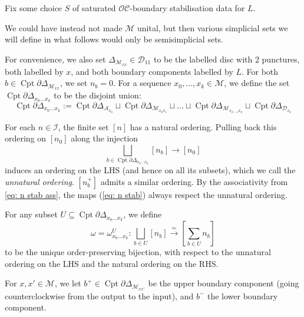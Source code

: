 \documentclass{TPmod}
\newcommand{\Cptd}{\operatorname{Cpt}\partial}
\newcommand{\cA}{\mathcal{A}}
\newcommand{\cC}{\mathcal{C}}
\newcommand{\cD}{\mathcal{D}}
\newcommand{\cI}{\mathcal{I}}
\newcommand{\cM}{\mathcal{M}}
\newcommand{\cO}{\mathcal{O}}
\renewcommand{\cong}{\simeq}
\numberwithin{equation}{section}
\begin{document}
    Fix some choice $S$ of saturated $\cO\cC$-boundary stabilisation data for $L$.

    
    
    

    \begin{rmk}
        We could have instead not made $\cM$ unital, but then various simplicial sets we will define in what follows would only be semisimplicial sets.
    \end{rmk}

    
    For convenience, we also set $\Delta_{\cM_{xx}} \in \cD_{11}$ to be the labelled disc with 2 punctures, both labelled by $x$, and both boundary components labelled by $L$. For both $b \in \Cptd\Delta_{\cM_{xx}}$, we set $n_b = 0$. For a sequence $x_0, \ldots, x_k \in \cM$, we define the set $\Cptd\Delta_{x_0 \ldots x_k}$ to be the disjoint union:
    \begin{equation}
        \Cptd\Delta_{x_0 \ldots x_k} := \Cptd\Delta_{\cA_{x_0}} \sqcup \Cptd\Delta_{\cM_{x_0 x_1}} \sqcup \ldots \sqcup \Cptd\Delta_{\cM_{x_{k-1} x_k}} \sqcup \Cptd\Delta_{\cD_{x_k}}
    \end{equation}
    
    For each $n \in \cI$, the finite set $[n]$ has a natural ordering. Pulling back this ordering on $[n_0]$ along the injection 
    \begin{equation}
        \bigsqcup\limits_{b \in \Cptd\Delta_{x_0 \ldots x_k}} [n_b] \to [n_0]
    \end{equation}
    induces an ordering on the LHS (and hence on all its subsets), which we call the \emph{unnatural ordering}. $[n^+_b]$ admits a similar ordering. By the associativity from \ref{eq: n stab ass}, the maps (\ref{eq: n stab}) always respect the unnatural ordering.

    For any subset $U \subseteq \Cptd\Delta_{x_0 \ldots x_k}$, we define 
    \begin{equation}
        \omega=\omega^U_{x_0 \ldots x_k}: \bigsqcup\limits_{b \in U} [n_b] \xrightarrow{\cong} \left[ \sum\limits_{b \in U} n_b\right]
    \end{equation}
    to be the unique order-preserving bijection, with respect to the unnatural ordering on the LHS and the natural ordering on the RHS. 

    For $x,x' \in \cM$, we let $b^+ \in \Cptd\Delta_{\cM_{xx'}}$ be the upper boundary component (going counterclockwise from the output to the input), and $b^-$ the lower boundary component.
\end{document}

